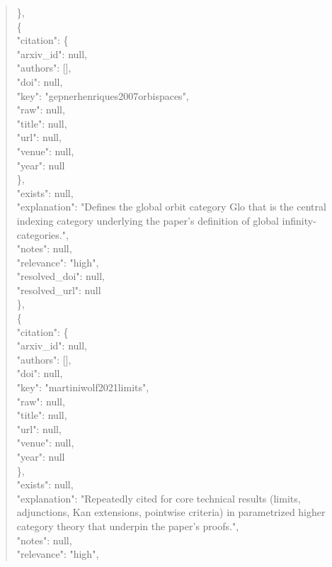 \documentclass[11pt]{article}
\begin{document}
\begin{quote}
    \},\\
    \{\\
      "citation": \{\\
        "arxiv\_id": null,\\
        "authors": [],\\
        "doi": null,\\
        "key": "gepnerhenriques2007orbispaces",\\
        "raw": null,\\
        "title": null,\\
        "url": null,\\
        "venue": null,\\
        "year": null\\
      \},\\
      "exists": null,\\
      "explanation": "Defines the global orbit category Glo that is the central indexing category underlying the paper's definition of global infinity-categories.",\\
      "notes": null,\\
      "relevance": "high",\\
      "resolved\_doi": null,\\
      "resolved\_url": null\\
    \},\\
    \{\\
      "citation": \{\\
        "arxiv\_id": null,\\
        "authors": [],\\
        "doi": null,\\
        "key": "martiniwolf2021limits",\\
        "raw": null,\\
        "title": null,\\
        "url": null,\\
        "venue": null,\\
        "year": null\\
      \},\\
      "exists": null,\\
      "explanation": "Repeatedly cited for core technical results (limits, adjunctions, Kan extensions, pointwise criteria) in parametrized higher category theory that underpin the paper's proofs.",\\
      "notes": null,\\
      "relevance": "high",\\

\end{quote}
\end{document}
